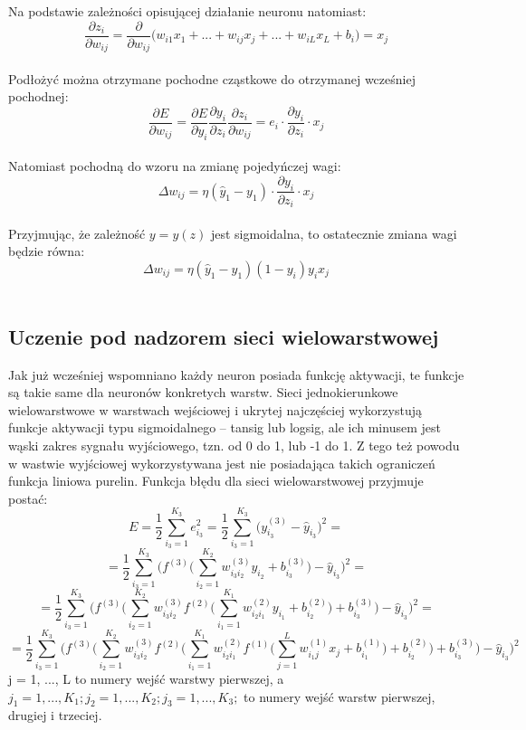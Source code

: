 \documentclass[a4paper, 12pt]{report}
\begin{document}
Na podstawie zależności opisującej działanie neuronu natomiast:
$$\frac{\partial z_i}{\partial w_{ij}} = \frac{\partial}{\partial w_{ij}} \Big( w_{i1}x_1 + ... + w_{ij}x_{j} + ... + w_{iL}x_L + b_i \Big) = x_j $$ \\

Podłożyć można otrzymane pochodne cząstkowe do otrzymanej wcześniej pochodnej:
$$\frac{\partial E}{\partial w_{ij}} = \frac{\partial E}{\partial y_i} \frac{\partial y_i}{\partial z_i} \frac{\partial z_i}{\partial w_{ij}} = e_i \cdot \frac{\partial y_i}{\partial z_i} \cdot x_j$$\\

Natomiast pochodną do wzoru na zmianę pojedyńczej wagi:
$$\Delta w_{ij} =  \eta (\widehat{y}_1 - y_1) \cdot \frac{\partial y_i}{\partial z_i} \cdot x_j$$\\

Przyjmując, że zależność $y= y(z)$ jest sigmoidalna, to ostatecznie zmiana wagi będzie równa:
$$\Delta w_{ij} =  \eta (\widehat{y}_1 - y_1) (1 - y_i)y_i x_j$$\\

\subsection{Uczenie pod nadzorem sieci wielowarstwowej}
Jak już wcześniej wspomniano każdy neuron posiada funkcję aktywacji, te funkcje są takie same dla neuronów konkretych warstw. Sieci jednokierunkowe wielowarstwowe w warstwach wejściowej i ukrytej najczęściej wykorzystują funkcje aktywacji typu sigmoidalnego – tansig lub logsig, ale ich minusem jest wąski zakres sygnału wyjściowego, tzn. od 0 do 1, lub -1 do 1. Z tego też powodu w wastwie wyjściowej wykorzystywana jest nie posiadająca takich ograniczeń funkcja liniowa purelin.
Funkcja błędu dla sieci wielowarstwowej przyjmuje postać:
$$E = \frac{1}{2} {\sum_{i_3=1}^{K_3}  e^{2}_{i_3}} = \frac{1}{2} {\sum_{i_3=1}^{K_3}  \big( y^{(3)}_{i_3} - \widehat{y}_{i_3} \big)^2} = $$
$$= \frac{1}{2} {\sum_{i_3=1}^{K_3} \Big( f^{(3)} \Big( {\sum_{i_2=1}^{K_2}  w^{(3)}_{i_3 i_2}y_{i_2} + b^{(3)}_{i_3} }\Big) - \widehat{y}_{i_3} \Big)^2} = $$
$$= \frac{1}{2} {\sum_{i_3=1}^{K_3} \Big( f^{(3)} \Big( {\sum_{i_2=1}^{K_2}  w^{(3)}_{i_3 i_2}f^{(2)}\Big( {\sum_{i_1=1}^{K_1}  w^{(2)}_{i_2 i_1}y_{i_1} + b^{(2)}_{i_2} } \Big) + b^{(3)}_{i_3} }\Big) - \widehat{y}_{i_3} \Big)^2} = $$
$$= \frac{1}{2} {\sum_{i_3=1}^{K_3} \Big( f^{(3)} \Big( {\sum_{i_2=1}^{K_2}  w^{(3)}_{i_3 i_2}f^{(2)}\Big( {\sum_{i_1=1}^{K_1}  w^{(2)}_{i_2 i_1}f^{(1)} \Big( {\sum_{j=1}^{L} w^{(1)}_{i_1 j}x_j + b^{(1)}_{i_1} }  \Big) + b^{(2)}_{i_2} } \Big) + b^{(3)}_{i_3} }\Big) - \widehat{y}_{i_3} \Big)^2} $$
j = 1, ..., L to numery wejść warstwy pierwszej, a $j_1 = 1, ..., K_1;  j_2 = 1, ..., K_2;  j_3 = 1, ..., K_3; $ to numery wejść warstw pierwszej, drugiej i trzeciej.
\end{document}
